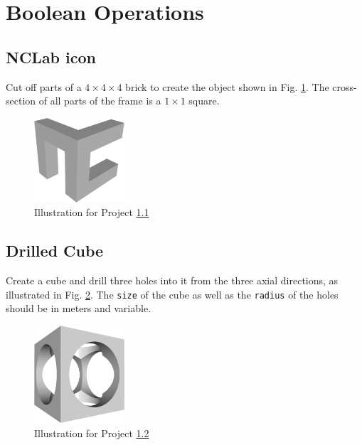 \section{Boolean Operations}

\subsection{NCLab icon} \label{4.1}
Cut off parts of a $4 \times 4 \times 4$ brick to create the object shown in 
Fig. \ref{fig:nclabicon}. The cross-section of all parts of the frame is 
a $1 \times 1$ square.


\begin{figure}[!ht]
\begin{center}
\includegraphics[width=0.3\textwidth]{img/nclabicon.png}
\end{center}
\vspace{-2mm}
\caption{Illustration for Project \ref{4.1}}
\label{fig:nclabicon}
\end{figure}
\noindent


\subsection{Drilled Cube} \label{4.2}
Create a cube and drill three holes into it from the three axial 
directions, as illustrated in Fig. \ref{fig:drilledcube}.
The {\tt size} of the cube as well as the {\tt radius} of the 
holes should be in meters and variable. 

\begin{figure}[!ht]
\begin{center}
\includegraphics[width=0.3\textwidth]{img/drilledcube.png}
\end{center}
\vspace{-2mm}
\caption{Illustration for Project \ref{4.2}}
\label{fig:drilledcube}
\end{figure}


